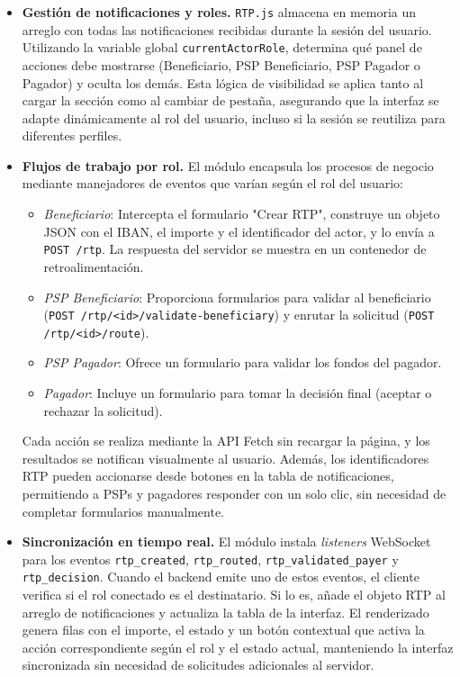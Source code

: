 \begin{itemize}
\begin{itemize}
            \item \textbf{Gestión de notificaciones y roles.} \texttt{RTP.js} almacena en memoria un arreglo con todas las notificaciones recibidas durante la sesión del usuario. Utilizando la variable global \texttt{currentActorRole}, determina qué panel de acciones debe mostrarse (Beneficiario, PSP Beneficiario, PSP Pagador o Pagador) y oculta los demás. Esta lógica de visibilidad se aplica tanto al cargar la sección como al cambiar de pestaña, asegurando que la interfaz se adapte dinámicamente al rol del usuario, incluso si la sesión se reutiliza para diferentes perfiles.

            \item \textbf{Flujos de trabajo por rol.} El módulo encapsula los procesos de negocio mediante manejadores de eventos que varían según el rol del usuario:
            \begin{itemize}
                \item \textit{Beneficiario}: Intercepta el formulario "Crear RTP", construye un objeto JSON con el IBAN, el importe y el identificador del actor, y lo envía a \texttt{POST /rtp}. La respuesta del servidor se muestra en un contenedor de retroalimentación.
                \item \textit{PSP Beneficiario}: Proporciona formularios para validar al beneficiario (\texttt{POST /rtp/\linebreak <id>/validate-beneficiary}) y enrutar la solicitud (\texttt{POST /rtp/<id>/route}).
                \item \textit{PSP Pagador}: Ofrece un formulario para validar los fondos del pagador.
                \item \textit{Pagador}: Incluye un formulario para tomar la decisión final (aceptar o rechazar la solicitud).
            \end{itemize}
            Cada acción se realiza mediante la API Fetch sin recargar la página, y los resultados se notifican visualmente al usuario. Además, los identificadores RTP pueden accionarse desde botones en la tabla de notificaciones, permitiendo a PSPs y pagadores responder con un solo clic, sin necesidad de completar formularios manualmente.

            \item \textbf{Sincronización en tiempo real.} El módulo instala \textit{listeners} WebSocket para los eventos \texttt{rtp\_created}, \texttt{rtp\_routed}, \texttt{rtp\_validated\_payer} y \texttt{rtp\_decision}. Cuando el backend emite uno de estos eventos, el cliente verifica si el rol conectado es el destinatario. Si lo es, añade el objeto RTP al arreglo de notificaciones y actualiza la tabla de la interfaz. El renderizado genera filas con el importe, el estado y un botón contextual que activa la acción correspondiente según el rol y el estado actual, manteniendo la interfaz sincronizada sin necesidad de solicitudes adicionales al servidor.


\end{itemize}
\end{itemize}
